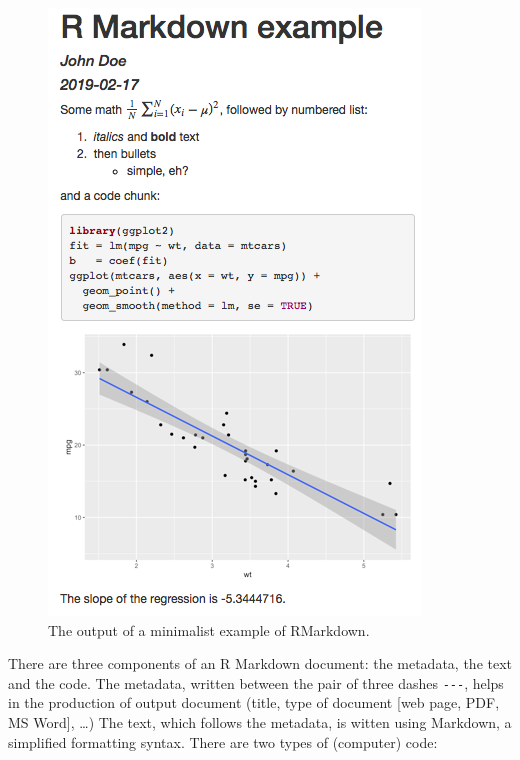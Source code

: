 \documentclass[conference,final,a4paper,]{IEEEtran}
\begin{document}
\begin{figure}[htb]

{\centering \includegraphics[width=1\linewidth]{figures/rmd-example} 

}

\caption{The output of a minimalist example of RMarkdown.}\label{fig:rmd-example}
\end{figure}

There are three components of an R Markdown document: the metadata, the
text and the code. The metadata, written between the pair of three
dashes \texttt{-\/-\/-}, helps in the production of output document
(title, type of document {[}web page, PDF, MS Word{]}, \ldots{}) The
text, which follows the metadata, is witten using Markdown, a simplified
formatting syntax. There are two types of (computer) code:
\end{document}
